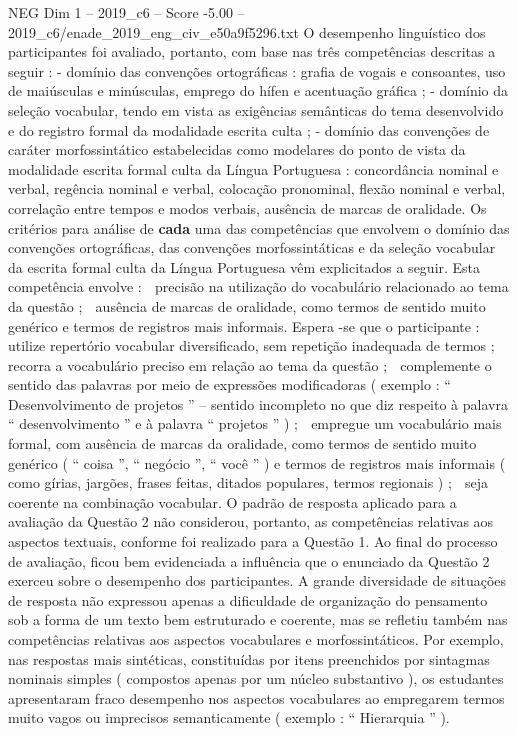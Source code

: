 \begin{textsample}{NEG Dim 1 – 2019\_c6 – Score -5.00 – 2019\_c6/enade\_2019\_eng\_civ\_e50a9f5296.txt}
O desempenho linguístico dos participantes foi avaliado, portanto, com base nas três competências descritas a seguir : - domínio das convenções ortográficas : grafia de vogais e consoantes, uso de maiúsculas e minúsculas, emprego do hífen e acentuação gráfica ; - domínio da seleção vocabular, tendo em vista as exigências semânticas do tema desenvolvido e do registro formal da modalidade escrita culta ; - domínio das convenções de caráter morfossintático estabelecidas como modelares do ponto de vista da modalidade escrita formal culta da Língua Portuguesa : concordância nominal e verbal, regência nominal e verbal, colocação pronominal, flexão nominal e verbal, correlação entre tempos e modos verbais, ausência de marcas de oralidade.
Os critérios para análise de \textbf{cada} uma das competências que envolvem o domínio das convenções ortográficas, das convenções morfossintáticas e da seleção vocabular da escrita formal culta da Língua Portuguesa vêm explicitados a seguir.
Esta competência envolve :  precisão na utilização do vocabulário relacionado ao tema da questão ;  ausência de marcas de oralidade, como termos de sentido muito genérico e termos de registros mais informais.
Espera -se que o participante :  utilize repertório vocabular diversificado, sem repetição inadequada de termos ;  recorra a vocabulário preciso em relação ao tema da questão ;  complemente o sentido das palavras por meio de expressões modificadoras ( exemplo : “ Desenvolvimento de projetos ” – sentido incompleto no que diz respeito à palavra “ desenvolvimento ” e à palavra “ projetos ” ) ;  empregue um vocabulário mais formal, com ausência de marcas da oralidade, como termos de sentido muito genérico ( “ coisa ”, “ negócio ”, “ você ” ) e termos de registros mais informais ( como gírias, jargões, frases feitas, ditados populares, termos regionais ) ;  seja coerente na combinação vocabular.
O padrão de resposta aplicado para a avaliação da Questão 2 não considerou, portanto, as competências relativas aos aspectos textuais, conforme foi realizado para a Questão 1.
Ao final do processo de avaliação, ficou bem evidenciada a influência que o enunciado da Questão 2 exerceu sobre o desempenho dos participantes.
A grande diversidade de situações de resposta não expressou apenas a dificuldade de organização do pensamento sob a forma de um texto bem estruturado e coerente, mas se refletiu também nas competências relativas aos aspectos vocabulares e morfossintáticos.
Por exemplo, nas respostas mais sintéticas, constituídas por itens preenchidos por sintagmas nominais simples ( compostos apenas por um núcleo substantivo ), os estudantes apresentaram fraco desempenho nos aspectos vocabulares ao empregarem termos muito vagos ou imprecisos semanticamente ( exemplo : “ Hierarquia ” ).

\end{textsample}
